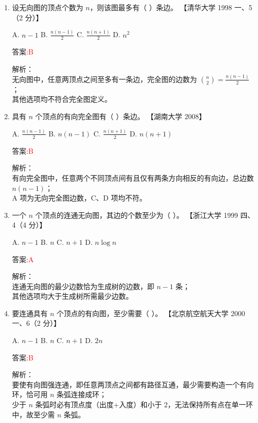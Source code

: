 \documentclass[lang=cn,newtx,10pt,scheme=chinese]{../../../elegantbook}
\begin{document}
\begin{enumerate}
    \item 设无向图的顶点个数为 $n$，则该图最多有（  ）条边。  
        【清华大学 1998 一、5（2 分）】
    
        A. $n-1$  
        B. $\frac{n(n-1)}{2}$  
        C. $\frac{n(n+1)}{2}$  
        D. $n^2$  
    
        答案:\textcolor{red}{B}
    
        解析：\\
        无向图中，任意两顶点之间至多有一条边，完全图的边数为 $\binom{n}{2}=\frac{n(n-1)}{2}$；\\
        其他选项均不符合完全图定义。\\
    
    \item 具有 $n$ 个顶点的有向完全图有（  ）条边。  
        【湖南大学 2008】
    
        A. $\frac{n(n-1)}{2}$  
        B. $n(n-1)$  
        C. $\frac{n(n+1)}{2}$  
        D. $n(n+1)$  
    
        答案:\textcolor{red}{B}
    
        解析：\\
        有向完全图中，任意两个不同顶点间有且仅有两条方向相反的有向边，总边数 $n(n-1)$；\\
        A 项为无向完全图边数，C、D 项均不符。\\
    
    \item 一个 $n$ 个顶点的连通无向图，其边的个数至少为（ ）。  
        【浙江大学 1999 四、4（4 分）】
    
        A. $n-1$  
        B. $n$  
        C. $n+1$  
        D. $n\log n$  
    
        答案:\textcolor{red}{A}
    
        解析：\\
        连通无向图的最少边数恰为生成树的边数，即 $n-1$ 条；\\
        其他选项均大于生成树所需最少边数。\\
     
    
        \item 要连通具有 $n$ 个顶点的有向图，至少需要（ ）。  
    【北京航空航天大学 2000 一、6（2 分）】

    A. $n-1$  
    B. $n$  
    C. $n+1$  
    D. $2n$

    答案:\textcolor{red}{B}

    解析：\\
    要使有向图强连通，即任意两顶点之间都有路径互通，最少需要构造一个有向环，恰可用 $n$ 条弧连接成环；\\
    少于 $n$ 条弧时必有顶点度（出度+入度）和小于 2，无法保持所有点在单一环中，故至少需 $n$ 条弧。\\


\end{enumerate}
\end{document}
